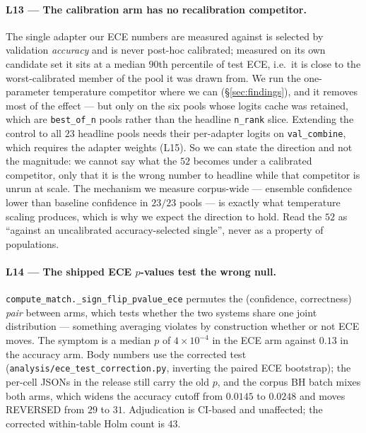 \documentclass[11pt]{article}
\begin{document}
\paragraph{L13 — The calibration arm has no recalibration competitor.} The single adapter our ECE numbers are measured against is selected by validation \emph{accuracy} and is never post-hoc calibrated; measured on its own candidate set it sits at a median $90$th percentile of test ECE, i.e.\ it is close to the worst-calibrated member of the pool it was drawn from. We run the one-parameter temperature competitor where we can (\S\ref{sec:findings}), and it removes most of the effect --- but only on the six pools whose logits cache was retained, which are \texttt{best\_of\_n} pools rather than the headline \texttt{n\_rank} slice. Extending the control to all $23$ headline pools needs their per-adapter logits on \texttt{val\_combine}, which requires the adapter weights (L15). So we can state the direction and not the magnitude: we cannot say what the $52$ becomes under a calibrated competitor, only that it is the wrong number to headline while that competitor is unrun at scale. The mechanism we measure corpus-wide --- ensemble confidence lower than baseline confidence in $23/23$ pools --- is exactly what temperature scaling produces, which is why we expect the direction to hold. Read the $52$ as ``against an uncalibrated accuracy-selected single'', never as a property of populations.

\paragraph{L14 — The shipped ECE $p$-values test the wrong null.} \texttt{compute\_\allowbreak match.\_\allowbreak sign\_\allowbreak flip\_\allowbreak pvalue\_\allowbreak ece} permutes the (confidence, correctness) \emph{pair} between arms, which tests whether the two systems share one joint distribution --- something averaging violates by construction whether or not ECE moves. The symptom is a median $p$ of $4\times10^{-4}$ in the ECE arm against $0.13$ in the accuracy arm. Body numbers use the corrected test (\texttt{analysis/\allowbreak ece\_\allowbreak test\_\allowbreak correction.\allowbreak py}, inverting the paired ECE bootstrap); the per-cell JSONs in the release still carry the old $p$, and the corpus BH batch mixes both arms, which widens the accuracy cutoff from $0.0145$ to $0.0248$ and moves REVERSED from $29$ to $31$. Adjudication is CI-based and unaffected; the corrected within-table Holm count is $43$.
\end{document}
